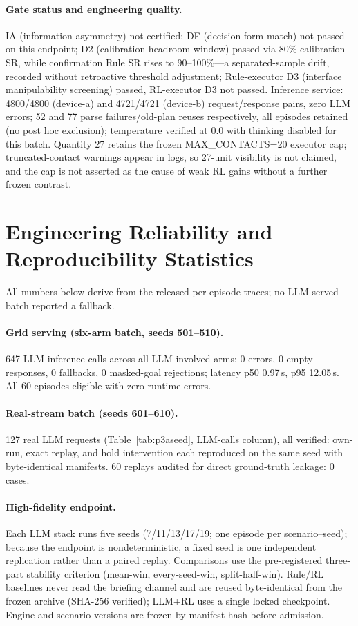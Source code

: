 \documentclass[sigconf,anonymous]{aamas}
\begin{document}
\paragraph{Gate status and engineering quality.}
IA (information asymmetry) not certified; DF (decision-form match) not passed on this endpoint; D2 (calibration headroom window) passed via 80\% calibration SR, while confirmation Rule SR rises to 90--100\%---a separated-sample drift, recorded without retroactive threshold adjustment; Rule-executor D3 (interface manipulability screening) passed, RL-executor D3 not passed. Inference service: 4800/4800 (device-a) and 4721/4721 (device-b) request/response pairs, zero LLM errors; 52 and 77 parse failures/old-plan reuses respectively, all episodes retained (no post hoc exclusion); temperature verified at 0.0 with thinking disabled for this batch. Quantity 27 retains the frozen MAX\_CONTACTS=20 executor cap; truncated-contact warnings appear in logs, so 27-unit visibility is not claimed, and the cap is not asserted as the cause of weak RL gains without a further frozen contrast.

\section{Engineering Reliability and Reproducibility Statistics}\label{app:J}

All numbers below derive from the released per-episode traces; no LLM-served batch reported a fallback.

\paragraph{Grid serving (six-arm batch, seeds 501--510).}
647 LLM inference calls across all LLM-involved arms: 0 errors, 0 empty responses, 0 fallbacks, 0 masked-goal rejections; latency p50 0.97\,s, p95 12.05\,s. All 60 episodes eligible with zero runtime errors.

\paragraph{Real-stream batch (seeds 601--610).}
127 real LLM requests (Table~\ref{tab:p3aseed}, LLM-calls column), all verified: own-run, exact replay, and hold intervention each reproduced on the same seed with byte-identical manifests. 60 replays audited for direct ground-truth leakage: 0 cases.

\paragraph{High-fidelity endpoint.}
Each LLM stack runs five seeds (7/11/13/17/19; one episode per scenario--seed); because the endpoint is nondeterministic, a fixed seed is one independent replication rather than a paired replay. Comparisons use the pre-registered three-part stability criterion (mean-win, every-seed-win, split-half-win). Rule/RL baselines never read the briefing channel and are reused byte-identical from the frozen archive (SHA-256 verified); LLM+RL uses a single locked checkpoint. Engine and scenario versions are frozen by manifest hash before admission.
\end{document}
